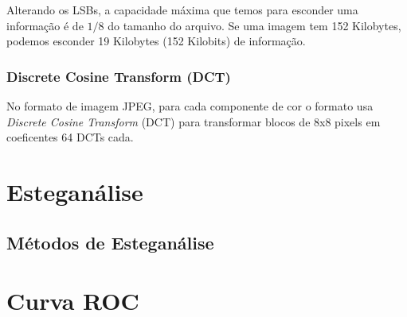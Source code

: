 Alterando os LSBs, a capacidade máxima que temos para esconder uma informação é de $1/8$ do tamanho do arquivo. Se uma imagem tem 152 Kilobytes, podemos esconder 19 Kilobytes (152 Kilobits) de informação.

\subsubsection{Discrete Cosine Transform (DCT)}

No formato de imagem JPEG, para cada componente de cor o formato usa \emph{Discrete Cosine Transform} (DCT) para transformar blocos de 8x8 pixels em coeficentes 64 DCTs cada. \cite{provos_hide_2003}


\section{Esteganálise}

\subsection{Métodos de Esteganálise}

\section{Curva ROC}
